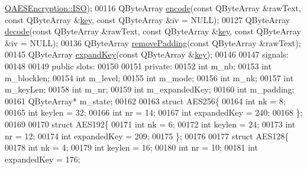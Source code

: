 \begin{DoxyCode}
      \mbox{\hyperlink{class_q_a_e_s_encryption_ab0a65cdea4eac21ef32530010d1b0247a4fb686e6a16d4242ff35311d2e7c422d}{QAESEncryption::ISO}});
00116     QByteArray \mbox{\hyperlink{class_q_a_e_s_encryption_a0c56eddd6f03e93b1f7faad464044d65}{encode}}(\textcolor{keyword}{const} QByteArray &rawText, \textcolor{keyword}{const} QByteArray &\mbox{\hyperlink{namespace_errors_dict_setup_a09c268098d09ffb8e5504f30fa6d5dd9}{key}}, \textcolor{keyword}{const} QByteArray &iv = 
      NULL);
00127     QByteArray \mbox{\hyperlink{class_q_a_e_s_encryption_a58f972f2b66c2454edd5112495463bba}{decode}}(\textcolor{keyword}{const} QByteArray &rawText, \textcolor{keyword}{const} QByteArray &\mbox{\hyperlink{namespace_errors_dict_setup_a09c268098d09ffb8e5504f30fa6d5dd9}{key}}, \textcolor{keyword}{const} QByteArray &iv = 
      NULL);
00136     QByteArray \mbox{\hyperlink{class_q_a_e_s_encryption_a4dc7e77485e5a3e63eebc99b9386c17b}{removePadding}}(\textcolor{keyword}{const} QByteArray &rawText);
00145     QByteArray \mbox{\hyperlink{class_q_a_e_s_encryption_a5bfbb972f84a8376fceed648553c0912}{expandKey}}(\textcolor{keyword}{const} QByteArray &\mbox{\hyperlink{namespace_errors_dict_setup_a09c268098d09ffb8e5504f30fa6d5dd9}{key}});
00146 
00147 signals:
00148 
00149 \textcolor{keyword}{public} slots:
00150 
00151 \textcolor{keyword}{private}:
00152     \textcolor{keywordtype}{int} m\_nb;
00153     \textcolor{keywordtype}{int} m\_blocklen;
00154     \textcolor{keywordtype}{int} m\_level;
00155     \textcolor{keywordtype}{int} m\_mode;
00156     \textcolor{keywordtype}{int} m\_nk;
00157     \textcolor{keywordtype}{int} m\_keyLen;
00158     \textcolor{keywordtype}{int} m\_nr;
00159     \textcolor{keywordtype}{int} m\_expandedKey;
00160     \textcolor{keywordtype}{int} m\_padding;
00161     QByteArray* m\_state;
00162 
00163     \textcolor{keyword}{struct }AES256\{
00164         \textcolor{keywordtype}{int} nk = 8;
00165         \textcolor{keywordtype}{int} keylen = 32;
00166         \textcolor{keywordtype}{int} nr = 14;
00167         \textcolor{keywordtype}{int} expandedKey = 240;
00168     \};
00169 
00170     \textcolor{keyword}{struct }AES192\{
00171         \textcolor{keywordtype}{int} nk = 6;
00172         \textcolor{keywordtype}{int} keylen = 24;
00173         \textcolor{keywordtype}{int} nr = 12;
00174         \textcolor{keywordtype}{int} expandedKey = 209;
00175     \};
00176 
00177     \textcolor{keyword}{struct }AES128\{
00178         \textcolor{keywordtype}{int} nk = 4;
00179         \textcolor{keywordtype}{int} keylen = 16;
00180         \textcolor{keywordtype}{int} nr = 10;
00181         \textcolor{keywordtype}{int} expandedKey = 176;

\end{DoxyCode}
